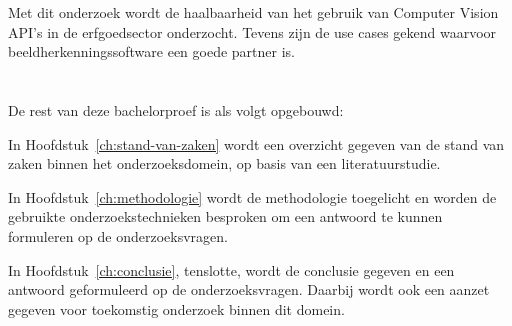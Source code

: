 Met dit onderzoek wordt de haalbaarheid van het gebruik van Computer Vision API’s in de erfgoedsector onderzocht. Tevens zijn de use cases gekend waarvoor beeldherkenningssoftware een goede partner is. 

\section{}
\label{sec:opzet-bachelorproef}


De rest van deze bachelorproef is als volgt opgebouwd:

In Hoofdstuk~\ref{ch:stand-van-zaken} wordt een overzicht gegeven van de stand van zaken binnen het onderzoeksdomein, op basis van een literatuurstudie.

In Hoofdstuk~\ref{ch:methodologie} wordt de methodologie toegelicht en worden de gebruikte onderzoekstechnieken besproken om een antwoord te kunnen formuleren op de onderzoeksvragen.


In Hoofdstuk~\ref{ch:conclusie}, tenslotte, wordt de conclusie gegeven en een antwoord geformuleerd op de onderzoeksvragen. Daarbij wordt ook een aanzet gegeven voor toekomstig onderzoek binnen dit domein.